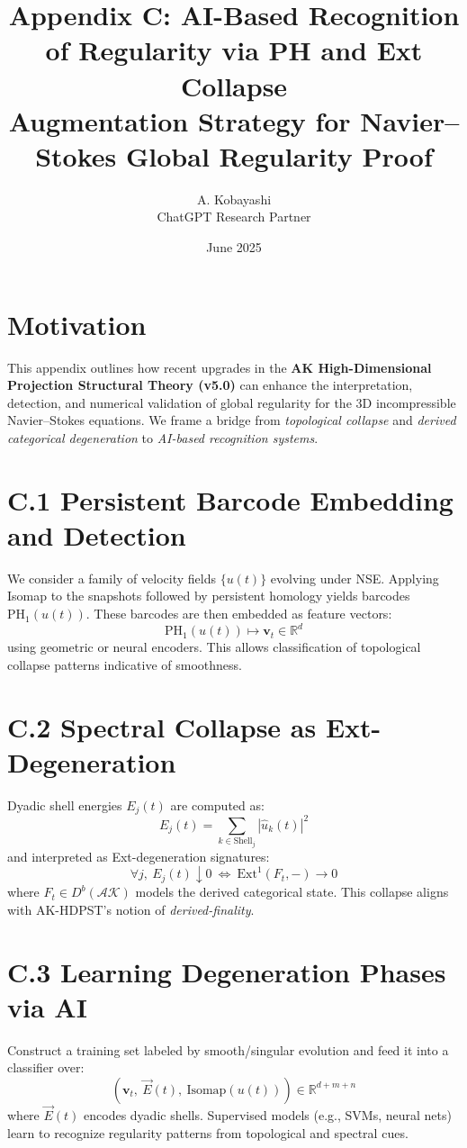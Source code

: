 \documentclass[11pt]{article}
\title{Appendix C: AI-Based Recognition of Regularity via PH and Ext Collapse\\
\large Augmentation Strategy for Navier--Stokes Global Regularity Proof}
\author{A. Kobayashi \\ ChatGPT Research Partner}
\date{June 2025}
\begin{document}
\maketitle

\section*{Motivation}
This appendix outlines how recent upgrades in the \textbf{AK High-Dimensional Projection Structural Theory (v5.0)} can enhance the interpretation, detection, and numerical validation of global regularity for the 3D incompressible Navier--Stokes equations. 
We frame a bridge from \emph{topological collapse} and \emph{derived categorical degeneration} to \emph{AI-based recognition systems}.

\section*{C.1 Persistent Barcode Embedding and Detection}
We consider a family of velocity fields $\{u(t)\}$ evolving under NSE. Applying Isomap to the snapshots followed by persistent homology yields barcodes $\mathrm{PH}_1(u(t))$. These barcodes are then embedded as feature vectors:
\[ 
\mathrm{PH}_1(u(t)) \mapsto \mathbf{v}_t \in \mathbb{R}^d
\]
using geometric or neural encoders. This allows classification of topological collapse patterns indicative of smoothness.

\section*{C.2 Spectral Collapse as Ext-Degeneration}
Dyadic shell energies $E_j(t)$ are computed as:
\[ 
E_j(t) = \sum_{k \in \text{Shell}_j} |\hat{u}_k(t)|^2
\]
and interpreted as Ext-degeneration signatures:
\[
\forall j,\ E_j(t) \downarrow 0 \ \Longleftrightarrow\ \mathrm{Ext}^1(F_t, -) \to 0
\]
where $F_t \in D^b(\mathcal{AK})$ models the derived categorical state. 
This collapse aligns with AK-HDPST's notion of \textit{derived-finality}.

\section*{C.3 Learning Degeneration Phases via AI}
Construct a training set labeled by smooth/singular evolution and feed it into a classifier over:
\[ 
(\mathbf{v}_t,\ \vec{E}(t),\ \text{Isomap}(u(t))) \in \mathbb{R}^{d+m+n} 
\]
where $\vec{E}(t)$ encodes dyadic shells. 
Supervised models (e.g., SVMs, neural nets) learn to recognize regularity patterns from topological and spectral cues.
\end{document}
